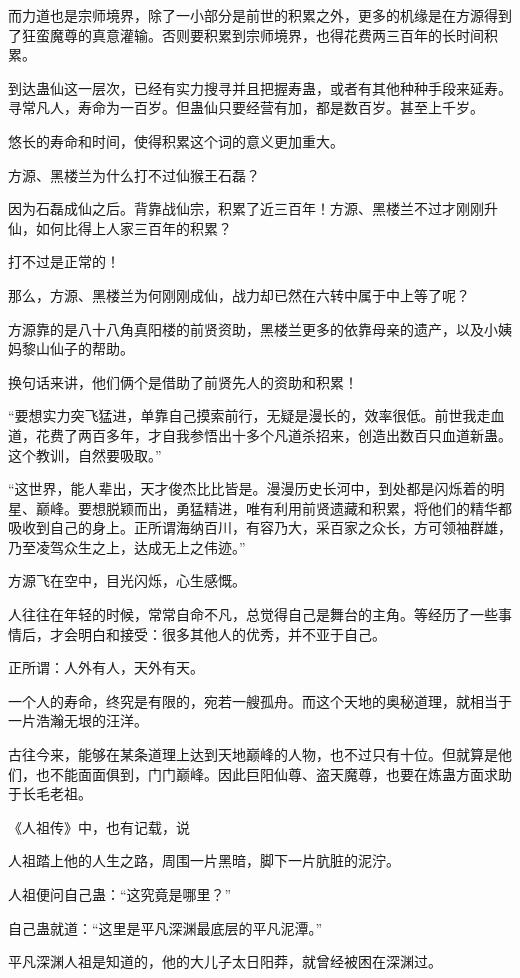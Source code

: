 \begin{this_body}
而力道也是宗师境界，除了一小部分是前世的积累之外，更多的机缘是在方源得到了狂蛮魔尊的真意灌输。否则要积累到宗师境界，也得花费两三百年的长时间积累。

到达蛊仙这一层次，已经有实力搜寻并且把握寿蛊，或者有其他种种手段来延寿。寻常凡人，寿命为一百岁。但蛊仙只要经营有加，都是数百岁。甚至上千岁。

悠长的寿命和时间，使得积累这个词的意义更加重大。

方源、黑楼兰为什么打不过仙猴王石磊？

因为石磊成仙之后。背靠战仙宗，积累了近三百年！方源、黑楼兰不过才刚刚升仙，如何比得上人家三百年的积累？

打不过是正常的！

那么，方源、黑楼兰为何刚刚成仙，战力却已然在六转中属于中上等了呢？

方源靠的是八十八角真阳楼的前贤资助，黑楼兰更多的依靠母亲的遗产，以及小姨妈黎山仙子的帮助。

换句话来讲，他们俩个是借助了前贤先人的资助和积累！

“要想实力突飞猛进，单靠自己摸索前行，无疑是漫长的，效率很低。前世我走血道，花费了两百多年，才自我参悟出十多个凡道杀招来，创造出数百只血道新蛊。这个教训，自然要吸取。”

“这世界，能人辈出，天才俊杰比比皆是。漫漫历史长河中，到处都是闪烁着的明星、巅峰。要想脱颖而出，勇猛精进，唯有利用前贤遗藏和积累，将他们的精华都吸收到自己的身上。正所谓海纳百川，有容乃大，采百家之众长，方可领袖群雄，乃至凌驾众生之上，达成无上之伟迹。”

方源飞在空中，目光闪烁，心生感慨。

人往往在年轻的时候，常常自命不凡，总觉得自己是舞台的主角。等经历了一些事情后，才会明白和接受：很多其他人的优秀，并不亚于自己。

正所谓：人外有人，天外有天。

一个人的寿命，终究是有限的，宛若一艘孤舟。而这个天地的奥秘道理，就相当于一片浩瀚无垠的汪洋。

古往今来，能够在某条道理上达到天地巅峰的人物，也不过只有十位。但就算是他们，也不能面面俱到，门门巅峰。因此巨阳仙尊、盗天魔尊，也要在炼蛊方面求助于长毛老祖。

《人祖传》中，也有记载，说

人祖踏上他的人生之路，周围一片黑暗，脚下一片肮脏的泥泞。

人祖便问自己蛊：“这究竟是哪里？”

自己蛊就道：“这里是平凡深渊最底层的平凡泥潭。”

平凡深渊人祖是知道的，他的大儿子太日阳莽，就曾经被困在深渊过。


\end{this_body}
